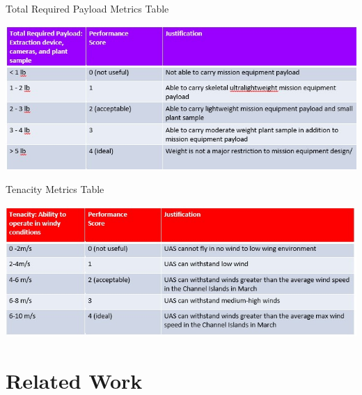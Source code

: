 \documentclass{wrcecapstone}
\begin{document}
\begin{table}
\caption{Total Required Payload Metrics Table}
\label{tab:2.5.3}
\begin{center}
\includegraphics[width=\columnwidth]{figures/table-253.jpg}
\end{center}
\end{table}
\begin{table}
\caption{Tenacity Metrics Table}
\label{tab:2.5.4}
\begin{center}
\includegraphics[width=\columnwidth]{figures/table-254.jpg}
\end{center}
\end{table} 






\section{Related Work}
\end{document}
